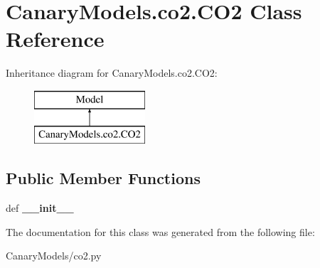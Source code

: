 \hypertarget{class_canary_models_1_1co2_1_1_c_o2}{\section{Canary\-Models.\-co2.\-C\-O2 Class Reference}
\label{class_canary_models_1_1co2_1_1_c_o2}
}
Inheritance diagram for Canary\-Models.\-co2.\-C\-O2\-:\begin{figure}[H]
\begin{center}
\leavevmode
\includegraphics[height=2.000000cm]{class_canary_models_1_1co2_1_1_c_o2}
\end{center}
\end{figure}
\subsection*{Public Member Functions}
\begin{DoxyCompactItemize}
\item 
\hypertarget{class_canary_models_1_1co2_1_1_c_o2_ac9ebe317e99995b63ea820f59490a4c6}{def {\bfseries \-\_\-\-\_\-init\-\_\-\-\_\-}}\label{class_canary_models_1_1co2_1_1_c_o2_ac9ebe317e99995b63ea820f59490a4c6}

\end{DoxyCompactItemize}


The documentation for this class was generated from the following file\-:\begin{DoxyCompactItemize}
\item 
Canary\-Models/co2.\-py\end{DoxyCompactItemize}
